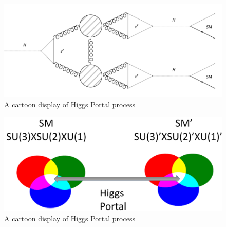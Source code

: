 \begin{figure}[h!]
  \caption{A cartoon display of Higgs Portal process}
  \label{fig:HiggsPortal}
  \centering
  \includegraphics[width=0.87\linewidth]{figs/TwinHiggs.png}
\end{figure}
\begin{figure}[h!]
  \caption{A cartoon display of Higgs Portal process}
  \label{fig:2HiggsPortal}
  \centering
  \includegraphics[width=0.87\linewidth]{figs/Portalcartoon.png}
\end{figure}
